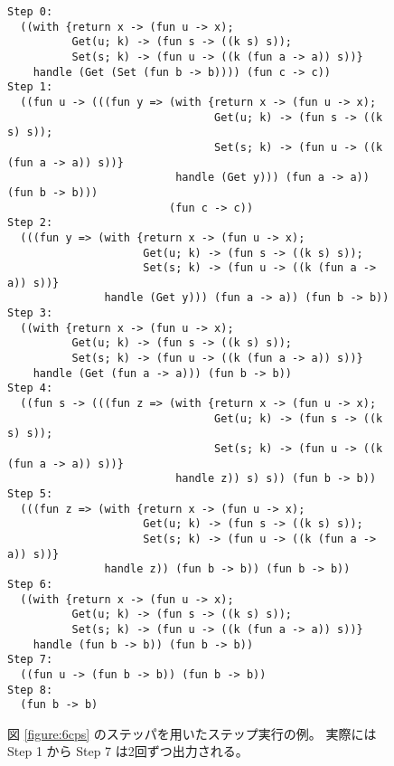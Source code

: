 \begin{figure}
\begin{spacing}{0.9}
\begin{verbatim}
Step 0:
  ((with {return x -> (fun u -> x);
          Get(u; k) -> (fun s -> ((k s) s));
          Set(s; k) -> (fun u -> ((k (fun a -> a)) s))}
    handle (Get (Set (fun b -> b)))) (fun c -> c))
Step 1:
  ((fun u -> (((fun y => (with {return x -> (fun u -> x);
                                Get(u; k) -> (fun s -> ((k s) s));
                                Set(s; k) -> (fun u -> ((k (fun a -> a)) s))}
                          handle (Get y))) (fun a -> a)) (fun b -> b)))
                         (fun c -> c))
Step 2:
  (((fun y => (with {return x -> (fun u -> x);
                     Get(u; k) -> (fun s -> ((k s) s));
                     Set(s; k) -> (fun u -> ((k (fun a -> a)) s))}
               handle (Get y))) (fun a -> a)) (fun b -> b))
Step 3:
  ((with {return x -> (fun u -> x);
          Get(u; k) -> (fun s -> ((k s) s));
          Set(s; k) -> (fun u -> ((k (fun a -> a)) s))}
    handle (Get (fun a -> a))) (fun b -> b))
Step 4:
  ((fun s -> (((fun z => (with {return x -> (fun u -> x);
                                Get(u; k) -> (fun s -> ((k s) s));
                                Set(s; k) -> (fun u -> ((k (fun a -> a)) s))}
                          handle z)) s) s)) (fun b -> b))
Step 5:
  (((fun z => (with {return x -> (fun u -> x);
                     Get(u; k) -> (fun s -> ((k s) s));
                     Set(s; k) -> (fun u -> ((k (fun a -> a)) s))}
               handle z)) (fun b -> b)) (fun b -> b))
Step 6:
  ((with {return x -> (fun u -> x);
          Get(u; k) -> (fun s -> ((k s) s));
          Set(s; k) -> (fun u -> ((k (fun a -> a)) s))}
    handle (fun b -> b)) (fun b -> b))
Step 7:
  ((fun u -> (fun b -> b)) (fun b -> b))
Step 8:
  (fun b -> b)
\end{verbatim}
\end{spacing}
\caption{図 \ref{figure:6cps} のステッパを用いたステップ実行の例。
実際には Step 1 から Step 7 は2回ずつ出力される。}
\label{figure:step_example}
\end{figure}
